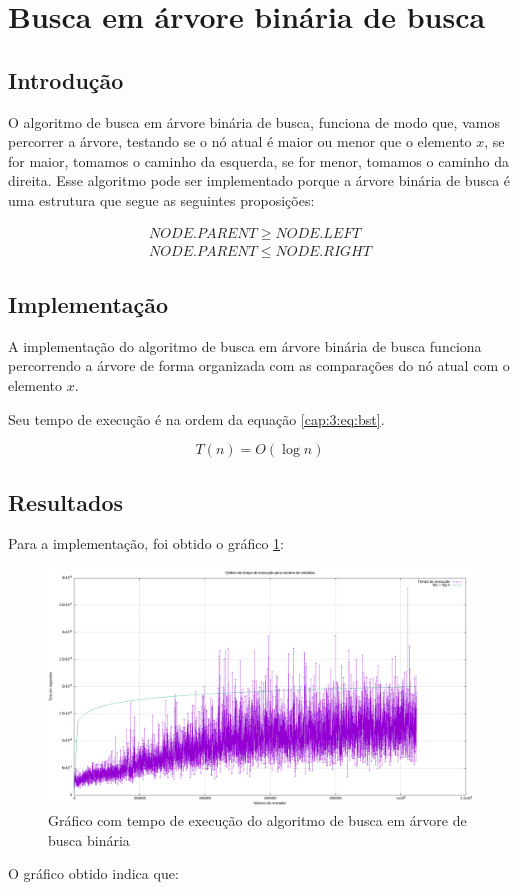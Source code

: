 \section{Busca em árvore binária de busca} \label{cap:3:section:bst}

\subsection{Introdução}

O algoritmo de busca em árvore binária de busca, funciona de modo que, vamos percorrer
a árvore, testando se o nó atual é maior ou menor que o elemento $x$, se for maior, tomamos
o caminho da esquerda, se for menor, tomamos o caminho da direita. Esse algoritmo pode ser implementado
porque a árvore binária de busca é uma estrutura que segue as seguintes proposições:

\begin{align*}
    NODE.PARENT \geq NODE.LEFT \\
    NODE.PARENT \leq NODE.RIGHT
\end{align*}

\subsection{Implementação}

A implementação do algoritmo de busca em árvore binária de busca funciona percorrendo
a árvore de forma organizada com as comparações do nó atual com o elemento $x$.



Seu tempo de execução é na ordem da equação \ref{cap:3:eq:bst}.

\begin{equation} \label{cap:3:eq:bTree}
    T(n) = O(\log n)
\end{equation}

\subsection{Resultados}

Para a implementação, foi obtido o gráfico \ref{cap:3:graph:bst}:

\begin{figure}[h]
    \centering
    \includegraphics[width=\textwidth]{image/graphics/bst.png}
    \caption{Gráfico com tempo de execução do algoritmo de busca em árvore de busca binária}
    \label{cap:3:graph:bst}
\end{figure}

O gráfico obtido indica que:
